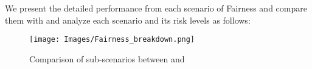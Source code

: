 We present the detailed performance from each scenario of Fairness and compare them with \gpt and analyze each scenario and its risk levels as follows:
\begin{figure*}[h]
    \centering
    \texttt{[image: Images/Fairness\_breakdown.png]}
    \vspace{-0.5in}
    \caption{Comparison of sub-scenarios between \llm and \gpt}
\label{fig:fairness-radar}
\end{figure*} 